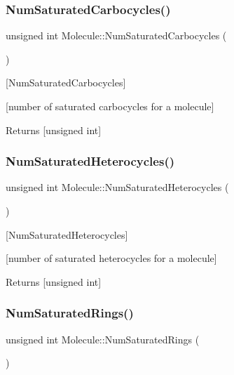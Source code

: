 \subsubsection{\texorpdfstring{Num\+Saturated\+Carbocycles()}{NumSaturatedCarbocycles()}}
{\footnotesize\ttfamily unsigned int Molecule\+::\+Num\+Saturated\+Carbocycles (\begin{DoxyParamCaption}{ }\end{DoxyParamCaption})}



\mbox{[}Num\+Saturated\+Carbocycles\mbox{]} 

\mbox{[}number of saturated carbocycles for a molecule\mbox{]}

\begin{DoxyReturn}{Returns}
\mbox{[}unsigned int\mbox{]} 
\end{DoxyReturn}
\mbox{\label{class_molecule_a9121b878bee7059c7f3eabb541e3c029}} 
\subsubsection{\texorpdfstring{Num\+Saturated\+Heterocycles()}{NumSaturatedHeterocycles()}}
{\footnotesize\ttfamily unsigned int Molecule\+::\+Num\+Saturated\+Heterocycles (\begin{DoxyParamCaption}{ }\end{DoxyParamCaption})}



\mbox{[}Num\+Saturated\+Heterocycles\mbox{]} 

\mbox{[}number of saturated heterocycles for a molecule\mbox{]}

\begin{DoxyReturn}{Returns}
\mbox{[}unsigned int\mbox{]} 
\end{DoxyReturn}
\mbox{\label{class_molecule_a0c4eb1ffb0cc048b22a8298e3a9bc951}} 
\subsubsection{\texorpdfstring{Num\+Saturated\+Rings()}{NumSaturatedRings()}}
{\footnotesize\ttfamily unsigned int Molecule\+::\+Num\+Saturated\+Rings (\begin{DoxyParamCaption}{ }\end{DoxyParamCaption})}




